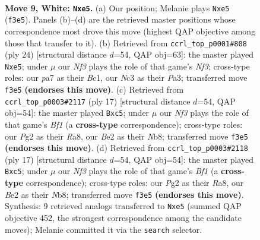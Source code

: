 \documentclass[11pt]{article}
\begin{document}
\clearpage

\begin{figure}[p]\centering
\begin{subfigure}{0.46\textwidth}\centering
\resizebox{\linewidth}{!}{%
\newchessgame
\chessboard[
  setfen={rnbr2k1/ppp2pbp/5np1/4p3/2P1P3/2N2N2/PP2BPPP/R1B1K2R w KQ - 0 9},
  showmover=false,
  pgfstyle=straightmove, color=movearrow, markmove={f3-e5}
]}
\caption{}
\end{subfigure}\hfill
\begin{subfigure}{0.46\textwidth}\centering
\resizebox{\linewidth}{!}{%
\newchessgame
\chessboard[
  setfen={r1br2k1/ppp2pbp/5np1/n3p3/2P5/PPN2NP1/4PPBP/1RB2RK1 w - - 0 13},
  showmover=false,
  pgfstyle=straightmove, color=movearrow, markmove={f3-e5}
]}
\caption{}
\end{subfigure}
\\[4pt]
\begin{subfigure}{0.46\textwidth}\centering
\resizebox{\linewidth}{!}{%
\newchessgame
\chessboard[
  setfen={rnb1kb1r/1p3ppp/p3pn2/2P5/2B5/4PN2/PP3PPP/RNBR2K1 b kq - 0 9},
  showmover=false,
  pgfstyle=straightmove, color=movearrow, markmove={f8-c5}
]}
\caption{}
\end{subfigure}\hfill
\begin{subfigure}{0.46\textwidth}\centering
\resizebox{\linewidth}{!}{%
\newchessgame
\chessboard[
  setfen={rnb1kb1r/1p3ppp/p3pn2/2P5/2B5/4PN2/PP3PPP/RNBR2K1 b kq - 0 9},
  showmover=false,
  pgfstyle=straightmove, color=movearrow, markmove={f8-c5}
]}
\caption{}
\end{subfigure}
\caption{\textbf{Move 9, White: \texttt{Nxe5}.} (a) Our position; Melanie plays \texttt{Nxe5} (\texttt{f3e5}). Panels (b)--(d) are the retrieved master positions whose correspondence most drove this move (highest QAP objective among those that transfer to it). (b) Retrieved from \texttt{ccrl\_top\_p0001\#808} (ply 24) [structural distance $d$=54, QAP obj=63]: the master played \texttt{Nxe5}; under $\mu$ our \emph{Nf3} plays the role of that game's \emph{Nf3}; cross-type roles: our \emph{p}a7 as their \emph{B}c1, our \emph{N}c3 as their \emph{P}a3; transferred move \texttt{f3e5} \textbf{(endorses this move)}. (c) Retrieved from \texttt{ccrl\_top\_p0003\#2117} (ply 17) [structural distance $d$=54, QAP obj=54]: the master played \texttt{Bxc5}; under $\mu$ our \emph{Nf3} plays the role of that game's \emph{Bf1} (a \textbf{cross-type} correspondence); cross-type roles: our \emph{P}g2 as their \emph{R}a8, our \emph{B}e2 as their \emph{N}b8; transferred move \texttt{f3e5} \textbf{(endorses this move)}. (d) Retrieved from \texttt{ccrl\_top\_p0003\#2118} (ply 17) [structural distance $d$=54, QAP obj=54]: the master played \texttt{Bxc5}; under $\mu$ our \emph{Nf3} plays the role of that game's \emph{Bf1} (a \textbf{cross-type} correspondence); cross-type roles: our \emph{P}g2 as their \emph{R}a8, our \emph{B}e2 as their \emph{N}b8; transferred move \texttt{f3e5} \textbf{(endorses this move)}. Synthesis: 9 retrieved analogs transferred to \texttt{Nxe5} (summed QAP objective 452, the strongest correspondence among the candidate moves); Melanie committed it via the \texttt{search} selector.}
\label{fig:thought-m16}
\end{figure}
\end{document}
